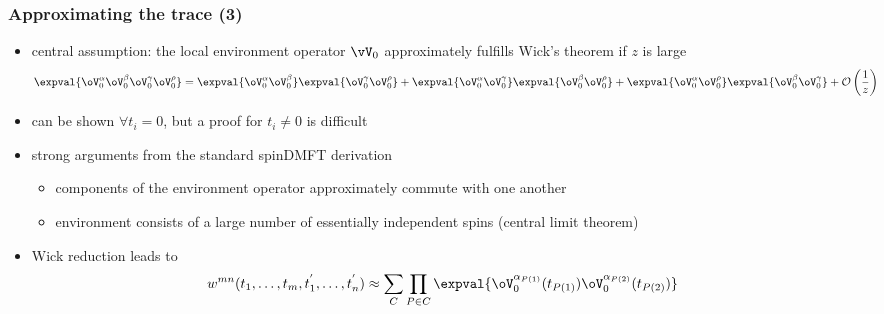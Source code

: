 \begin{frame}
	\frametitle{ Approximating the trace (3) }
    \begin{itemize}
        \item central assumption: the local environment operator $\vV_{0}$ approximately fulfills Wick's theorem if $z$ is large\slidecite{\zobov}
        \begin{align*}
            \expval{ \oV_0^{\alpha} \oV_0^{\beta} \oV_0^{\gamma} \oV_0^{\rho} } &= \expval{ \oV_0^{\alpha} \oV_0^{\beta} } \expval{ \oV_0^{\gamma} \oV_0^{\rho} } + \expval{ \oV_0^{\alpha} \oV_0^{\gamma} } \expval{ \oV_0^{\beta} \oV_0^{\rho} } + \expval{ \oV_0^{\alpha} \oV_0^{\rho} } \expval{ \oV_0^{\beta} \oV_0^{\gamma} } + \mathcal{O}\left(\frac1{z}\right)
        \end{align*}
        \item can be shown $\forall t_i = 0$, but a proof for $t_i \neq 0$ is difficult
        \item strong arguments from the standard spinDMFT derivation
        \begin{itemize}
            \item components of the environment operator approximately commute with one another
            \item environment consists of a large number of essentially independent spins (central limit theorem)
        \end{itemize}
        \item Wick reduction leads to
        \begin{align*}
            w^{mn}(t_1,\dots,t_m,t_1^{'},\dots,t_n^{'}) &\approx \sum_{C} \prod_{P\in C} \expval{ \oV_0^{\alpha_{P(1)}} (t_{P(1)}) \oV_0^{\alpha_{P(2)}} (t_{P(2)}) }
        \end{align*}
    \end{itemize}
\end{frame}

